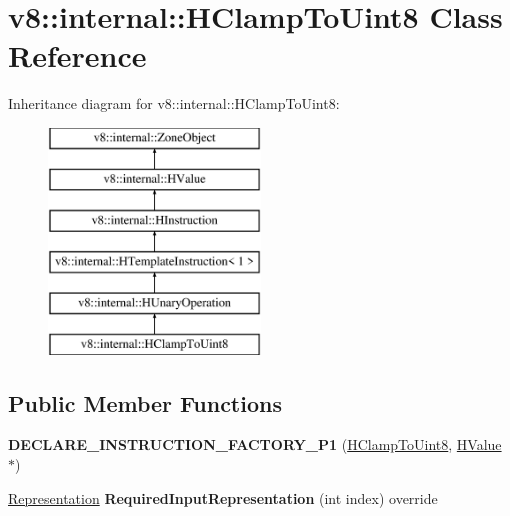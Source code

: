 \hypertarget{classv8_1_1internal_1_1_h_clamp_to_uint8}{}\section{v8\+:\+:internal\+:\+:H\+Clamp\+To\+Uint8 Class Reference}
\label{classv8_1_1internal_1_1_h_clamp_to_uint8}
Inheritance diagram for v8\+:\+:internal\+:\+:H\+Clamp\+To\+Uint8\+:\begin{figure}[H]
\begin{center}
\leavevmode
\includegraphics[height=6.000000cm]{classv8_1_1internal_1_1_h_clamp_to_uint8}
\end{center}
\end{figure}
\subsection*{Public Member Functions}
\begin{DoxyCompactItemize}
\item 
{\bfseries D\+E\+C\+L\+A\+R\+E\+\_\+\+I\+N\+S\+T\+R\+U\+C\+T\+I\+O\+N\+\_\+\+F\+A\+C\+T\+O\+R\+Y\+\_\+\+P1} (\hyperlink{classv8_1_1internal_1_1_h_clamp_to_uint8}{H\+Clamp\+To\+Uint8}, \hyperlink{classv8_1_1internal_1_1_h_value}{H\+Value} $\ast$)\hypertarget{classv8_1_1internal_1_1_h_clamp_to_uint8_a9dae7a6df62e871e2a4fc950c209a0da}{}\label{classv8_1_1internal_1_1_h_clamp_to_uint8_a9dae7a6df62e871e2a4fc950c209a0da}

\item 
\hyperlink{classv8_1_1internal_1_1_representation}{Representation} {\bfseries Required\+Input\+Representation} (int index) override\hypertarget{classv8_1_1internal_1_1_h_clamp_to_uint8_a5222635fb9e04d0e134cb9939e618864}{}\label{classv8_1_1internal_1_1_h_clamp_to_uint8_a5222635fb9e04d0e134cb9939e618864}

\end{DoxyCompactItemize}
